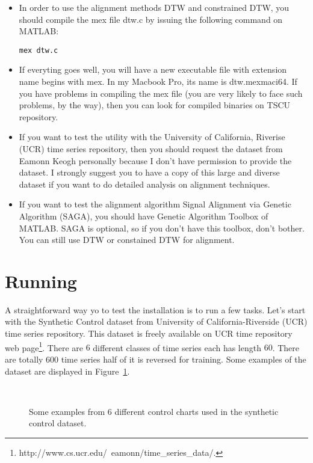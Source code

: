 \documentclass{article}
\begin{document}
\begin{itemize}
\item In order to use the alignment methods DTW and constrained DTW, you should compile the mex file dtw.c by issuing the following command on MATLAB:
\begin{verbatim}
mex dtw.c
\end{verbatim}

\item If everyting goes well, you will have a new executable file with extension name begins with mex. In my Macbook Pro, its name is dtw.mexmaci64. If you have problems in compiling the mex file (you are very likely to face such problems, by the way), then you can look for compiled binaries on TSCU repository.

\item If you want to test the utility with the University of California, Riverise (UCR) time series repository, then you should request the dataset from Eamonn Keogh personally because I don't have permission to provide the dataset. I strongly suggest you to have a copy of this large and diverse dataset if you want to do detailed analysis on alignment techniques.

\item If you want to test the alignment algorithm Signal Alignment via Genetic Algorithm (SAGA), you should have Genetic Algorithm Toolbox of MATLAB. SAGA is optional, so if you don't have this toolbox, don't bother. You can still use DTW or constained DTW for alignment.
\end{itemize}
\section{Running}
A straightforward way yo to test the installation is to run a few tasks. Let's start with the Synthetic Control dataset from University of California-Riverside (UCR) time series repository. This dataset is freely available on UCR time repository web page\footnote{http://www.cs.ucr.edu/~eamonn/time\_series\_data/.}. There are $6$ different classes of time series each has length $60$. There are totally $600$ time series half of it is reversed for training. Some examples of the dataset are displayed in Figure~\ref{fig_synthetic}.

	\begin{figure}[!h]
	\centering
	\\%
	\caption{Some examples from 6 different control charts used in the synthetic control dataset.}
	\label{fig_synthetic}
	\end{figure}
\end{document}
